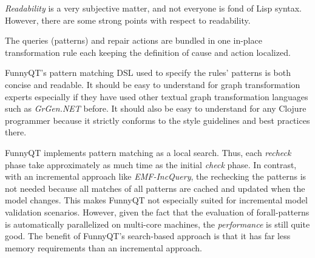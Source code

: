 \documentclass[submission]{eptcs}
\begin{document}
\emph{Readability} is a very subjective matter, and not everyone is fond of
Lisp syntax.  However, there are some strong points with respect to
readability.
\begin{inparaenum}[(1)]
\item The queries (patterns) and repair actions are bundled in one in-place
  transformation rule each keeping the definition of cause and action
  localized.
\item FunnyQT's pattern matching DSL used to specify the rules' patterns is
  both concise and readable.  It should be easy to understand for graph
  transformation experts especially if they have used other textual graph
  transformation languages such as \emph{GrGen.NET} before.  It should also be
  easy to understand for any Clojure programmer because it strictly conforms to
  the style guidelines and best practices there.
\end{inparaenum}

FunnyQT implements pattern matching as a local search.  Thus, each
\emph{recheck} phase take approximately as much time as the initial
\emph{check} phase.  In contrast, with an incremental approach like
\emph{EMF-IncQuery}, the rechecking the patterns is not needed because all
matches of all patterns are cached and updated when the model changes.  This
makes FunnyQT not especially suited for incremental model validation scenarios.
However, given the fact that the evaluation of forall-patterns is automatically
parallelized on multi-core machines, the \emph{performance} is still quite
good.  The benefit of FunnyQT's search-based approach is that it has far less
memory requirements than an incremental approach.




\end{document}
